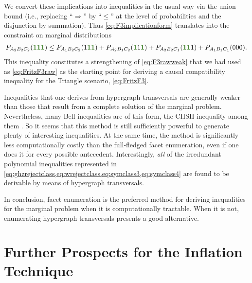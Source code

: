 \documentclass[aps,english,10pt,superscriptaddress,onecolumn,twoside,longbibliography,pra,floatfix,fleqn,nofootinbib]{revtex4-1}
\newcommand*{\mgreen}[1]{{\color{OliveGreen}{\mathbf{#1}}}}
\theoremstyle{definition}
\DeclarePairedDelimiter{\parens}{\lparen}{\rparen}
\newcommand{\elie}[1]{\textcolor{Fuchsia}{#1}}
\begin{document}
We convert these implications into inequalities in the usual way via the union bound (i.e., replacing ``$\Rightarrow$'' by ``$\leq$'' at the level of probabilities and the disjunction by summation). Thus \cref{eq:F3implicationform} translates into the constraint on marginal distributions
\begin{align}\label{eq:F3rawprobform}
    P_{A_2 B_2 C_2}\parens{\mgreen{1} \mgreen{1} \mgreen{1}} \leq P_{A_1 B_2 C_2}\parens{1 \mgreen{1 1}}+P_{A_2 B_1 C_2}\parens{\mgreen{1} 1 \mgreen{1}}+P_{A_2 B_2 C_1}\parens{\mgreen{1 1} 1} + P_{A_1 B_1 C_1}\parens{0 0 0}.
\end{align}
This inequality constitutes a strengthening of \cref{eq:F3rawweak} that we had used as \cref{eq:FritzF3raw} as the starting point for deriving a causal compatibility inequality for the Triangle scenario, \cref{eq:FritzF3}.  

Inequalities that one derives from hypergraph transversals are generally weaker than those that result from a complete solution of the marginal problem. Nevertheless, many Bell inequalities are of this form, the CHSH inequality among them \cite{Ghirardi08}.  So it seems that this method is still sufficiently powerful to generate plenty of interesting inequalities. At the same time, the method is significantly less computationally costly than the full-fledged facet enumeration, even if one does it for every possible antecedent. Interestingly, \emph{all} of the irredundant polynomial inequalities represented in \cref{eq:ghzrejectclass,eq:wrejectclass,eq:symclass3,eq:symclass4} are found to be derivable by means of hypergraph transversals.

In conclusion, facet enumeration is the preferred method for deriving inequalities for the marginal problem when it is computationally tractable.  When it is not, enumerating hypergraph transversals presents a good alternative. 


\section{Further Prospects for the Inflation Technique}\label{sec:otherprospects}
\end{document}
